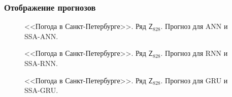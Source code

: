 \documentclass[specialist,
               substylefile = spbu.rtx,
               subf,href,colorlinks=true, 12p]{disser}
\begin{document}
\subsubsection{Отображение прогнозов}
\label{aweather_res}
\begin{figure}[H]
	\caption{<<Погода в Санкт-Петербурге>>. Ряд $\mathsf{Z}_{828}$. Прогноз для ANN и SSA-ANN.}
	\label{weather_res_ann}
\end{figure}

\begin{figure}[H]
	\caption{<<Погода в Санкт-Петербурге>>. Ряд $\mathsf{Z}_{828}$. Прогноз для RNN и SSA-RNN.}
	\label{weather_res_rnn}
\end{figure}

\begin{figure}[H]
	\caption{<<Погода в Санкт-Петербурге>>. Ряд $\mathsf{Z}_{828}$. Прогноз для GRU и SSA-GRU.}
	\label{weather_res_gru}
\end{figure}
\end{document}
